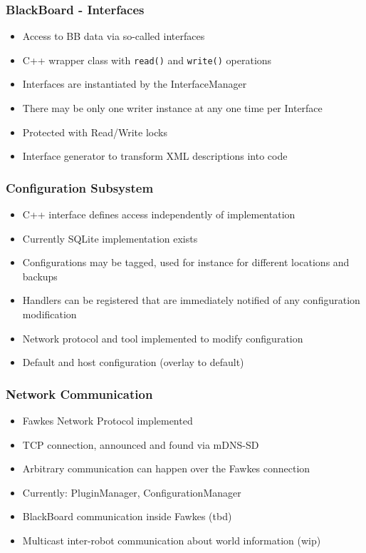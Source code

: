 \begin{frame}
  \frametitle{BlackBoard - Interfaces}
  \begin{itemize}
  \item Access to BB data via so-called interfaces
  \item C++ wrapper class with \texttt{read()} and \texttt{write()} operations
  \item Interfaces are instantiated by the InterfaceManager
  \item There may be only one writer instance at any one time per Interface
  \item Protected with Read/Write locks
  \item Interface generator to transform XML descriptions into code
  \end{itemize}
\end{frame}

\begin{frame}
  \frametitle{Configuration Subsystem}
  \begin{itemize}
  \item C++ interface defines access independently of implementation
  \item Currently SQLite implementation exists
  \item Configurations may be tagged, used for instance for different locations
    and backups
  \item Handlers can be registered that are immediately notified of any
    configuration modification
  \item Network protocol and tool implemented to modify configuration
  \item Default and host configuration (overlay to default)
  \end{itemize}
\end{frame}

\begin{frame}
  \frametitle{Network Communication}
  \begin{itemize}
  \item Fawkes Network Protocol implemented
  \item TCP connection, announced and found via mDNS-SD
  \item Arbitrary communication can happen over the Fawkes connection
  \item Currently: PluginManager, ConfigurationManager
  \item BlackBoard communication inside Fawkes (tbd)
  \item Multicast inter-robot communication about world information (wip)
  \end{itemize}
\end{frame}


